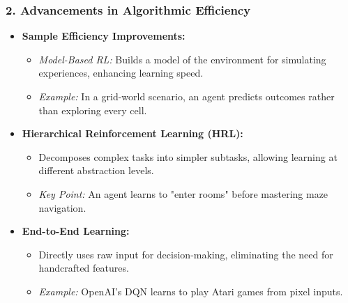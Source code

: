 \documentclass[aspectratio=169]{beamer}
\begin{document}
\begin{frame}[fragile]
    \frametitle{2. Advancements in Algorithmic Efficiency}
    \begin{itemize}
        \item \textbf{Sample Efficiency Improvements:}
        \begin{itemize}
            \item \textit{Model-Based RL:} Builds a model of the environment for simulating experiences, enhancing learning speed.
            \item \textit{Example:} In a grid-world scenario, an agent predicts outcomes rather than exploring every cell.
        \end{itemize}
        \item \textbf{Hierarchical Reinforcement Learning (HRL):}
        \begin{itemize}
            \item Decomposes complex tasks into simpler subtasks, allowing learning at different abstraction levels.
            \item \textit{Key Point:} An agent learns to "enter rooms" before mastering maze navigation.
        \end{itemize}
        \item \textbf{End-to-End Learning:}
        \begin{itemize}
            \item Directly uses raw input for decision-making, eliminating the need for handcrafted features.
            \item \textit{Example:} OpenAI’s DQN learns to play Atari games from pixel inputs.
        \end{itemize}
    \end{itemize}
\end{frame}
\end{document}
